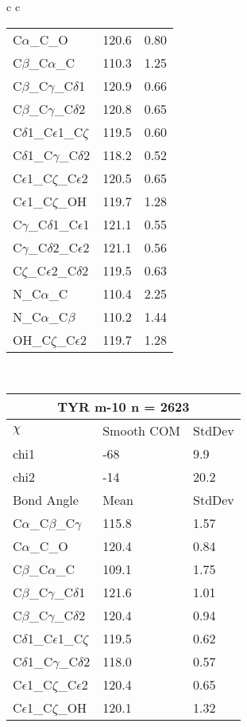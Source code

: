 \begin{longtable}{ c c }
\begin{tabular}{ l l l }
  C$\alpha$\_C\_O & 120.6 & 0.80\\
  C$\beta$\_C$\alpha$\_C & 110.3 & 1.25\\
  C$\beta$\_C$\gamma$\_C$\delta$1 & 120.9 & 0.66\\
  C$\beta$\_C$\gamma$\_C$\delta$2 & 120.8 & 0.65\\
  C$\delta$1\_C$\epsilon$1\_C$\zeta$ & 119.5 & 0.60\\
  C$\delta$1\_C$\gamma$\_C$\delta$2 & 118.2 & 0.52\\
  C$\epsilon$1\_C$\zeta$\_C$\epsilon$2 & 120.5 & 0.65\\
  C$\epsilon$1\_C$\zeta$\_OH & 119.7 & 1.28\\
  C$\gamma$\_C$\delta$1\_C$\epsilon$1 & 121.1 & 0.55\\
  C$\gamma$\_C$\delta$2\_C$\epsilon$2 & 121.1 & 0.56\\
  C$\zeta$\_C$\epsilon$2\_C$\delta$2 & 119.5 & 0.63\\
  N\_C$\alpha$\_C & 110.4 & 2.25\\
  N\_C$\alpha$\_C$\beta$ & 110.2 & 1.44\\
  OH\_C$\zeta$\_C$\epsilon$2 & 119.7 & 1.28\\
  \bottomrule
  \end{tabular}
  \\
  \begin{tabular}{ l l l }
  \toprule
  \multicolumn{3}{c}{TYR \textbf{m-10} n = 2623} \\ \toprule
  $\chi$       & Smooth COM & StdDev \\ \midrule
  chi1 & -68 & 9.9 \\ 
  chi2 & -14 & 20.2 \\ \midrule
  Bond Angle   & Mean     & StdDev \\ \midrule
  C$\alpha$\_C$\beta$\_C$\gamma$ & 115.8 & 1.57\\
  C$\alpha$\_C\_O & 120.4 & 0.84\\
  C$\beta$\_C$\alpha$\_C & 109.1 & 1.75\\
  C$\beta$\_C$\gamma$\_C$\delta$1 & 121.6 & 1.01\\
  C$\beta$\_C$\gamma$\_C$\delta$2 & 120.4 & 0.94\\
  C$\delta$1\_C$\epsilon$1\_C$\zeta$ & 119.5 & 0.62\\
  C$\delta$1\_C$\gamma$\_C$\delta$2 & 118.0 & 0.57\\
  C$\epsilon$1\_C$\zeta$\_C$\epsilon$2 & 120.4 & 0.65\\
  C$\epsilon$1\_C$\zeta$\_OH & 120.1 & 1.32\\

\end{tabular}
\end{longtable}
